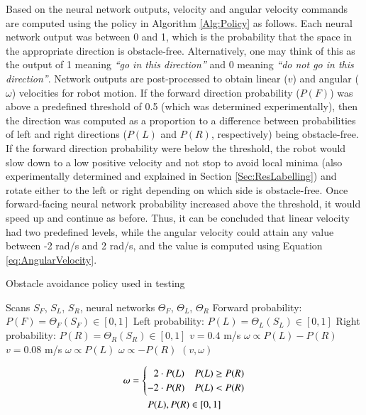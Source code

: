 Based on the neural network outputs, velocity and angular velocity commands are computed using the policy in Algorithm \ref{Alg:Policy} as follows. Each neural network output was between 0 and 1, which is the probability that the space in the appropriate direction is obstacle-free. Alternatively, one may think of this as the output of 1 meaning \emph{``go in this direction''} and 0 meaning \emph{``do not go in this direction''}. Network outputs are post-processed to obtain linear ($v$) and angular ($\omega$) velocities for robot motion. If the forward direction probability ($P(F)$) was above a predefined threshold of 0.5 (which was determined experimentally), then the direction was computed as a proportion to a difference between probabilities of left and right directions ($P(L)$ and $P(R)$, respectively) being obstacle-free. If the forward direction probability were below the threshold, the robot would slow down to a low positive velocity and not stop to avoid local minima (also experimentally determined and explained in Section \ref{Sec:ResLabelling}) and rotate either to the left or right depending on which side is obstacle-free. Once forward-facing neural network probability increased above the threshold, it would speed up and continue as before. Thus, it can be concluded that linear velocity had two predefined levels, while the angular velocity could attain any value between -2 rad/s and 2 rad/s, and the value is computed using Equation \ref{eq:AngularVelocity}.

\begin{algorithm}
\caption{Obstacle avoidance policy used in testing}
\label{Alg:Policy}
\begin{algorithmic}
	\renewcommand{\algorithmicrequire}{\textbf{Input:}}
    \renewcommand{\algorithmicensure}{\textbf{Output:}}
    \REQUIRE Scans $S_F$, $S_L$, $S_R$, neural networks $\Theta_F$, $\Theta_L$, $\Theta_R$
    \STATE Forward probability: $P(F) = \Theta_F(S_F) \in [0,1]$
    \STATE Left probability: $P(L) = \Theta_L(S_L) \in [0,1]$
    \STATE Right probability: $P(R) = \Theta_R(S_R) \in [0,1]$
    	\STATE $v=0.4$ m/s
        \STATE $\omega\propto P(L)-P(R)$
    \ELSE
    	\STATE $v=0.08$ m/s
        	\STATE $\omega\propto P(L)$
        \ELSE
        	\STATE $\omega\propto -P(R)$
        \ENDIF
    \ENDIF
    \ENSURE $(v,\omega)$
\end{algorithmic}
\end{algorithm}

\begin{gather}
    \label{eq:AngularVelocity}
    \omega = \begin{cases}
        \hphantom{-}2 \cdot P(L) & P(L) \geq P(R)\\
        -2 \cdot  P(R) & P(L) < P(R)
    \end{cases}\\
    P(L), P(R) \in [0,1] \nonumber
\end{gather}

